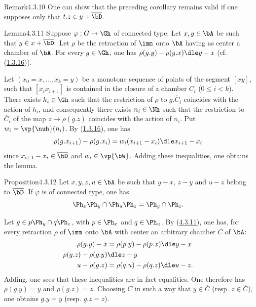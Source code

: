 \documentclass[12pt,a4paper,oneside,english]{smfart}
\makeatletter
\newcommand{\btanchor}[1]{\leavevmode\Hy@raisedlink{\hypertarget{bt:#1}{}}}
\newcommand{\btref}[1]{\hyperlink{bt:#1}{#1}}
\theoremstyle{definition}
\theoremstyle{bt}
\makeatother
\begin{document}
\begin{state}{Remark}{4.3.10}\btanchor{4.3.10}
\upshape
One can show that the preceding corollary remains valid if one supposes only
that $t.z \in y+\overline{\bD}$.
\end{state}

\begin{state}{Lemma}{4.3.11}\btanchor{4.3.11}
Suppose $\varphi : G\to\Gh$ of connected type. Let $x, y\in\bA$ be such that
$y \in x+\overline{\bD}$. Let $\rho$ be the retraction of $\imm$ onto $\bA$
having as center a chamber of $\bA$. For every $g\in\Gh$, one has
$\rho(g.y) - \rho(g.x) \dle y - x$ (cf. (\btref{1.3.16})).
\end{state}

Let $(x_0 = x, \dots, x_k = y)$ be a monotone sequence of points of the
segment $[xy]$, such that $[x_i x_{i+1}]$ is contained in the closure of a
chamber $C_i$ ($0\leqslant i < k$). There exists $h_i \in\Gh$ such that the
restriction of $\rho$ to $g.\overline{C}_i$ coincides with the action of
$h_i$, and consequently there exists $n_i\in\Nh$ such that the restriction to
$\overline{C}_i$ of the map $z\mapsto\rho(g.z)$ coincides with the action of
$n_i$. Put $w_i = \vp{\nuh}(n_i)$. By (\btref{1.3.16}), one has
\[
\rho(g.x_{i+1}) - \rho(g.x_i) = w_i(x_{i+1}-x_i) \dle x_{i+1}-x_i
\]
since $x_{i+1}-x_i \in\overline{\bD}$ and $w_i\in\vp{\bW}$. Adding these
inequalities, one obtains the lemma.

\begin{state}{Proposition}{4.3.12}\btanchor{4.3.12}
Let $x,y,z,u\in\bA$ be such that $y-x$, $z-y$ and $u-z$ belong to
$\overline{\bD}$. If $\varphi$ is of connected type, one has
\[
\Ph_{x}\Ph_{y}\cap\Ph_{u}\Ph_{z} = \Ph_{y}\cap\Ph_{z}.
\]
\end{state}

Let $g \in p\Ph_{y}\cap q\Ph_{z}$, with $p\in\Ph_{x}$ and $q\in\Ph_{u}$. By
(\btref{4.3.11}), one has, for every retraction $\rho$ of $\imm$ onto $\bA$ with
center an arbitrary chamber $C$ of $\bA$:
\begin{align}
\rho(g.y) - x &= \rho(p.y)-\rho(p.x) \dle y-x\\
\rho(g.z) - \rho(g.y) &\dle z-y\\
u - \rho(g.z) &= \rho(q.u)-\rho(q.z) \dle u-z .
\end{align}
Adding, one sees that these inequalities are in fact equalities. One
therefore has $\rho(g.y) = y$ and $\rho(g.z) = z$. Choosing $C$ in such a way
that $y\in\overline{C}$ (resp. $z\in\overline{C}$), one obtains $g.y = y$
(resp. $g.z = z$).
\end{document}
